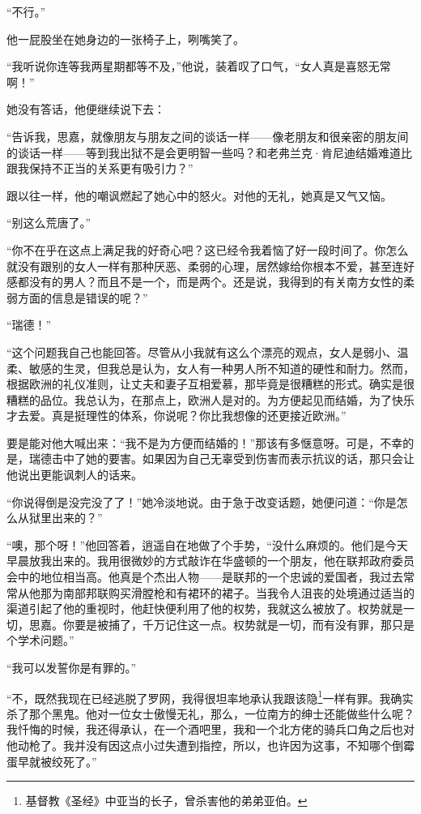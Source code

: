 \par “不行。”
\par 他一屁股坐在她身边的一张椅子上，咧嘴笑了。
\par “我听说你连等我两星期都等不及，”他说，装着叹了口气，“女人真是喜怒无常啊！”
\par 她没有答话，他便继续说下去：
\par “告诉我，思嘉，就像朋友与朋友之间的谈话一样——像老朋友和很亲密的朋友间的谈话一样——等到我出狱不是会更明智一些吗？和老弗兰克·肯尼迪结婚难道比跟我保持不正当的关系更有吸引力？”
\par 跟以往一样，他的嘲讽燃起了她心中的怒火。对他的无礼，她真是又气又恼。
\par “别这么荒唐了。”
\par “你不在乎在这点上满足我的好奇心吧？这已经令我着恼了好一段时间了。你怎么就没有跟别的女人一样有那种厌恶、柔弱的心理，居然嫁给你根本不爱，甚至连好感都没有的男人？而且不是一个，而是两个。还是说，我得到的有关南方女性的柔弱方面的信息是错误的呢？”
\par “瑞德！”
\par “这个问题我自己也能回答。尽管从小我就有这么个漂亮的观点，女人是弱小、温柔、敏感的生灵，但我总是认为，女人有一种男人所不知道的硬性和耐力。然而，根据欧洲的礼仪准则，让丈夫和妻子互相爱慕，那毕竟是很糟糕的形式。确实是很糟糕的品位。我总认为，在那点上，欧洲人是对的。为方便起见而结婚，为了快乐才去爱。真是挺理性的体系，你说呢？你比我想像的还更接近欧洲。”
\par 要是能对他大喊出来：“我不是为方便而结婚的！”那该有多惬意呀。可是，不幸的是，瑞德击中了她的要害。如果因为自己无辜受到伤害而表示抗议的话，那只会让他说出更能讽刺人的话来。
\par “你说得倒是没完没了了！”她冷淡地说。由于急于改变话题，她便问道：“你是怎么从狱里出来的？”
\par “噢，那个呀！”他回答着，逍遥自在地做了个手势，“没什么麻烦的。他们是今天早晨放我出来的。我用很微妙的方式敲诈在华盛顿的一个朋友，他在联邦政府委员会中的地位相当高。他真是个杰出人物——是联邦的一个忠诚的爱国者，我过去常常从他那为南部邦联购买滑膛枪和有裙环的裙子。当我令人沮丧的处境通过适当的渠道引起了他的重视时，他赶快便利用了他的权势，我就这么被放了。权势就是一切，思嘉。你要是被捕了，千万记住这一点。权势就是一切，而有没有罪，那只是个学术问题。”
\par “我可以发誓你是有罪的。”
\par “不，既然我现在已经逃脱了罗网，我得很坦率地承认我跟该隐\footnote{基督教《圣经》中亚当的长子，曾杀害他的弟弟亚伯。}一样有罪。我确实杀了那个黑鬼。他对一位女士傲慢无礼，那么，一位南方的绅士还能做些什么呢？我忏悔的时候，我还得承认，在一个酒吧里，我和一个北方佬的骑兵口角之后也对他动枪了。我并没有因这点小过失遭到指控，所以，也许因为这事，不知哪个倒霉蛋早就被绞死了。”
